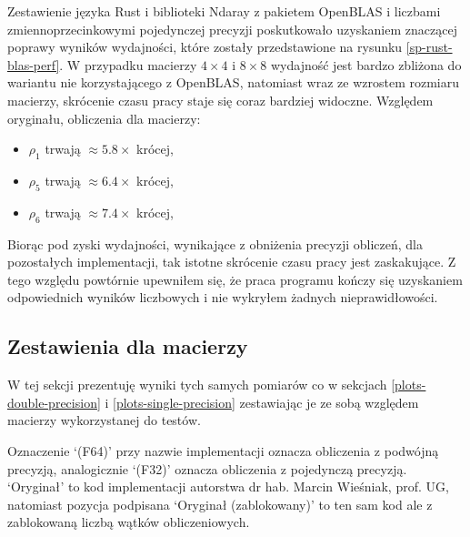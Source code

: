 \documentclass[11pt, a4paper]{article}
\begin{document}
\begin{sloppypar}
    Zestawienie języka Rust i biblioteki Ndaray z pakietem OpenBLAS i liczbami
    zmiennoprzecinkowymi pojedynczej precyzji poskutkowało uzyskaniem znaczącej poprawy
    wyników wydajności, które zostały przedstawione na rysunku \ref{sp-rust-blas-perf}.
    W przypadku macierzy $4\times4$ i $8\times8$ wydajność jest bardzo zbliżona do
    wariantu nie korzystającego z OpenBLAS, natomiast wraz ze wzrostem rozmiaru macierzy,
    skrócenie czasu pracy staje się coraz bardziej widoczne. Względem oryginału,
    obliczenia dla macierzy:
    \begin{itemize}
      \item $\rho_{1}$ trwają $\approx 5.8\times$ krócej,

      \item $\rho_{5}$ trwają $\approx 6.4\times$ krócej,

      \item $\rho_{6}$ trwają $\approx 7.4\times$ krócej,
    \end{itemize}
    Biorąc pod zyski wydajności, wynikające z obniżenia precyzji obliczeń, dla pozostałych
    implementacji, tak istotne skrócenie czasu pracy jest zaskakujące. Z tego względu powtórnie
    upewniłem się, że praca programu kończy się uzyskaniem odpowiednich wyników
    liczbowych i nie wykryłem żadnych nieprawidłowości.

    \FloatBarrier

    \subsection{Zestawienia dla macierzy}
    W tej sekcji prezentuję wyniki tych samych pomiarów co w sekcjach \ref{plots-double-precision}
    i \ref{plots-single-precision} zestawiając je ze sobą względem macierzy wykorzystanej
    do testów.

    Oznaczenie `(F64)' przy nazwie implementacji oznacza obliczenia z podwójną precyzją,
    analogicznie `(F32)' oznacza obliczenia z pojedynczą precyzją. `Oryginał' to kod implementacji
    autorstwa dr hab. Marcin Wieśniak, prof. UG, natomiast pozycja podpisana `Oryginał (zablokowany)'
    to ten sam kod ale z zablokowaną liczbą wątków obliczeniowych.


\end{sloppypar}
\end{document}
